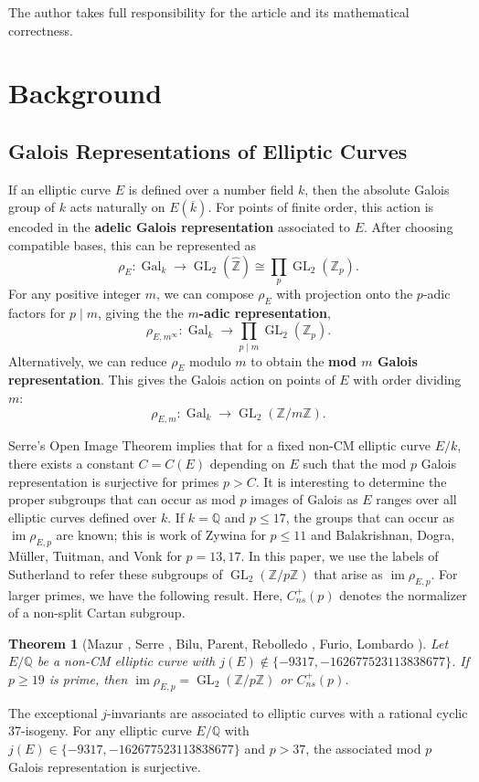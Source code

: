 \documentclass{amsart}
\newtheorem{theorem}{Theorem}
\theoremstyle{definition}
\newcommand{\Gal}{\operatorname{Gal}}
\newcommand{\Q}{\mathbb{Q}}
\newcommand{\Z}{\mathbb{Z}}
\newcommand{\GL}{\operatorname{GL}}
\DeclareMathOperator{\im}{im}
\begin{document}
The author takes full responsibility for the article and its mathematical correctness.

\section{Background}
\subsection{Galois Representations of Elliptic Curves} \label{Background}If an elliptic curve $E$ is defined over a number field $k$, then the absolute Galois group of $k$ acts naturally on $E(\overline{k})$. For points of finite order, this action is encoded in the \textbf{adelic Galois representation} associated to $E$. After choosing compatible bases, this can be represented as
\[
\rho_{E}: \Gal_k \rightarrow  \GL_2(\widehat{\Z}) \cong \prod_{p} \GL_2(\Z_p).
\]
For any positive integer $m$, we can compose $\rho_E$ with projection onto the $p$-adic factors for $p\mid m$, giving the the \textbf{$m$-adic representation},
\[
\rho_{E,m^{\infty}}: \Gal_k \rightarrow  \prod_{p\mid m} \GL_2(\Z_p).
\]
Alternatively, we can reduce $\rho_E$ modulo $m$ to obtain the \textbf{mod $m$ Galois representation}. This gives the Galois action on points of $E$ with order dividing $m$:
\[
\rho_{E,m}: \Gal_k \rightarrow   \GL_2(\Z/m\Z).
\]

Serre's Open Image Theorem \cite{serre72} implies that for a fixed non-CM elliptic curve $E/k$, there exists a constant $C=C(E)$ depending on $E$ such that the mod $p$ Galois representation is surjective for primes $p>C$.  It is interesting to determine the proper subgroups that can occur as mod $p$ images of Galois as $E$ ranges over all elliptic curves defined over $k$. If $k=\Q$ and $p \leq 17$, the groups that can occur as $\im \rho_{E,p}$ are known; this is work of Zywina \cite{ZywinaImages} for $p \leq 11$ and Balakrishnan, Dogra, M\"{u}ller, Tuitman, and Vonk \cite{Balakrishnan,17adic} for $p=13,17$. In this paper, we use the labels of Sutherland \cite{sutherland} to refer these subgroups of $\GL_2(\Z/p\Z)$ that arise as $\im \rho_{E,p}$. For larger primes, we have the following result. Here, $C_{ns}^+(p)$ denotes the normalizer of a non-split Cartan subgroup.
\begin{theorem}[Mazur \cite{mazurX0n}, Serre \cite{Serre1981}, Bilu, Parent, Rebolledo \cite{BPR13}, Furio, Lombardo \cite{FurioLombardo}] \label{SerreUnifProgress}
    Let $E/\Q$ be a non-CM elliptic curve with $j(E) \not\in\{ -9317, -162677523113838677\}$. If $p\geq 19$ is prime, then $\im \rho_{E,p}=\GL_2(\Z/p\Z)$ or $C_{ns}^+(p)$.
\end{theorem}
\noindent The exceptional $j$-invariants are associated to elliptic curves with a rational cyclic 37-isogeny. For any elliptic curve $E/\Q$ with $j(E) \in\{ -9317, -162677523113838677\}$ and $p>37$, the associated mod $p$ Galois representation is surjective.
\end{document}
